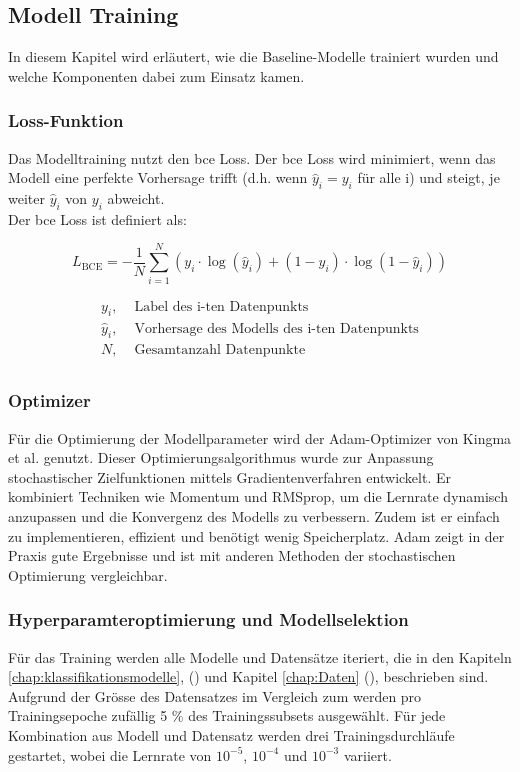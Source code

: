\subsection{Modell Training} \label{chap:modelltraining}
In diesem Kapitel wird erläutert, wie die Baseline-Modelle trainiert wurden und welche Komponenten dabei zum Einsatz kamen.

\subsubsection{Loss-Funktion} \label{chap:loss-function}
Das Modelltraining nutzt den \acrlong{bce} Loss. Der \acrshort{bce} Loss wird minimiert, wenn das Modell eine perfekte Vorhersage trifft (d.h. wenn $\hat{y}_i = y_i$ für alle i) und steigt, je weiter $\hat{y}_i$ von $y_i$ abweicht. \\
Der \acrshort{bce} Loss ist definiert als:

\begin{equation}
    L_{\text{BCE}} = -\frac{1}{N} \sum_{i=1}^{N} (y_i \cdot \log(\hat{y}_i) + (1-y_i) \cdot \log(1-\hat{y}_i))
    \label{eq:TrainingBCE}
\end{equation}

\begin{align*}
y_i,        &\text{ Label des i-ten Datenpunkts} \\
\hat{y}_i,  &\text{ Vorhersage des Modells des i-ten Datenpunkts} \\
N,          &\text{ Gesamtanzahl Datenpunkte} \\
\end{align*} 

\subsubsection{Optimizer} \label{chap:optimizer}
Für die Optimierung der Modellparameter wird der Adam-Optimizer von Kingma et al. \cite{kingma_adam_2017} genutzt. Dieser Optimierungsalgorithmus wurde zur Anpassung stochastischer Zielfunktionen mittels Gradientenverfahren entwickelt. Er kombiniert Techniken wie Momentum und RMSprop, um die Lernrate dynamisch anzupassen und die Konvergenz des Modells zu verbessern. Zudem ist er einfach zu implementieren, effizient und benötigt wenig Speicherplatz. Adam zeigt in der Praxis gute Ergebnisse und ist mit anderen Methoden der stochastischen Optimierung vergleichbar.

\subsubsection{Hyperparamteroptimierung und Modellselektion}
Für das Training werden alle Modelle und Datensätze iteriert, die in den Kapiteln \ref{chap:klassifikationsmodelle}, () und Kapitel \ref{chap:Daten} (), beschrieben sind. Aufgrund der Grösse des  Datensatzes im Vergleich zum  werden pro Trainingsepoche zufällig 5 \% des Trainingssubsets ausgewählt. Für jede Kombination aus Modell und Datensatz werden drei Trainingsdurchläufe gestartet, wobei die Lernrate von $10^{-5}$, $10^{-4}$ und $10^{-3}$ variiert.

